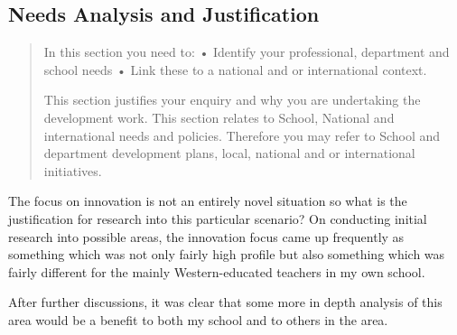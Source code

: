 \subsection{Needs Analysis and Justification}
\begin{quote}
In this section you need to:
•	Identify your professional, department and school needs
•	Link these to a national and or international context.

This section justifies your enquiry and why you are undertaking the development work. This section relates to School, National and international needs and policies. Therefore you may refer to School and department development plans, local, national and or international initiatives.
\end{quote}
The focus on innovation is not an entirely novel situation so what is the justification for research into this particular scenario? On conducting initial research into possible areas, the innovation focus came up frequently as something which was not only fairly high profile but also something which was fairly different for the mainly Western-educated teachers in my own school. 

After further discussions, it was clear that some more in depth analysis of this area would be a benefit to both my school and to others in the area.